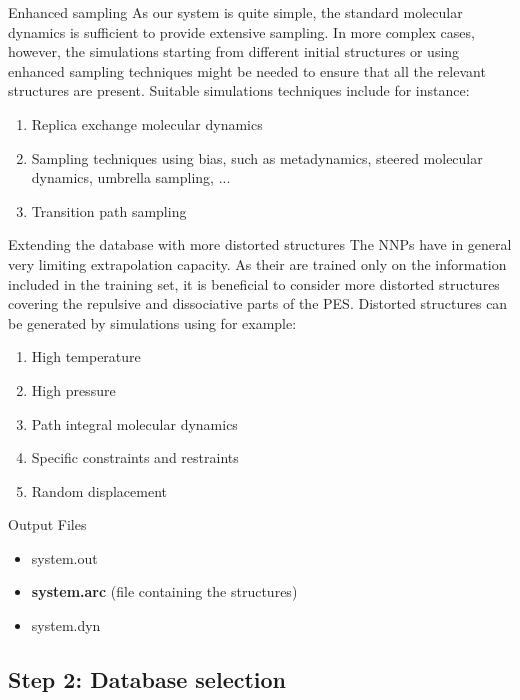 \documentclass[12pt]{article}
\newcommand\Warning{%
 \makebox[1.4em][c]{%
 \makebox[0pt][c]{\raisebox{.1em}{\small!}}%
 \makebox[0pt][c]{\color{red}\Large$\bigtriangleup$}}}%
\begin{document}
\begin{mybox1}{Enhanced sampling}
\Warning As our system is quite simple, the standard molecular dynamics is sufficient to provide extensive sampling. In more complex cases, however, the simulations starting from different initial structures or using enhanced sampling techniques might be needed to ensure that all the relevant structures are present. Suitable simulations techniques include for instance:
\begin{enumerate}
    \item Replica exchange molecular dynamics
    \item Sampling techniques using bias, such as metadynamics, steered molecular dynamics, umbrella sampling, ...
    \item Transition path sampling
\end{enumerate}
\end{mybox1}
\begin{mybox1}{Extending the database with more distorted structures}
\Warning The NNPs have in general very limiting extrapolation capacity. As their are trained only on the information included in the training set, it is beneficial to consider more distorted structures covering the repulsive and dissociative parts of the PES. Distorted structures can be generated by simulations using for example: 
\begin{enumerate}
    \item High temperature
    \item High pressure
    \item Path integral molecular dynamics
    \item Specific constraints and restraints
    \item Random displacement
\end{enumerate}

\end{mybox1}
\begin{mybox3}{Output Files}
\begin{itemize}
    \item system.out
    \item \textbf{system.arc} (file containing the structures)
    \item system.dyn
\end{itemize}
\end{mybox3}
%
\subsection{Step 2: Database selection}
\end{document}
